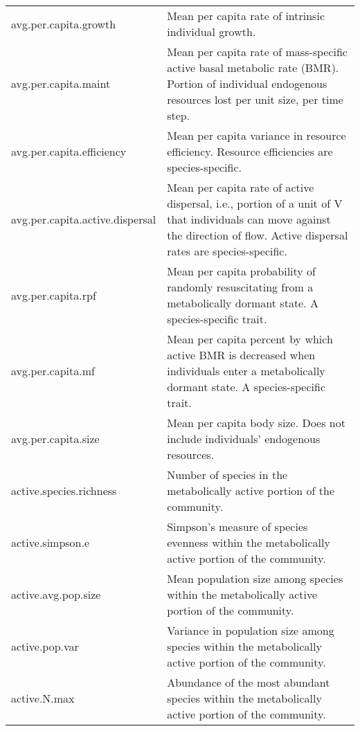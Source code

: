 \documentclass[12pt]{article}
\begin{document}
\begin{longtable}{| p{} | p{} |}
avg.per.capita.growth & Mean per capita rate of intrinsic individual growth. \\[6pt]

avg.per.capita.maint & Mean per capita rate of mass-specific active basal metabolic rate (BMR). Portion of individual endogenous resources lost per unit size, per time step. \\[6pt]

avg.per.capita.efficiency & Mean per capita variance in resource efficiency. Resource efficiencies are species-specific. \\[6pt]

avg.per.capita.active.dispersal & Mean per capita rate of active dispersal, i.e., portion of a unit of V that individuals can move against the direction of flow. Active dispersal rates are species-specific. \\[6pt]

avg.per.capita.rpf & Mean per capita probability of randomly resuscitating from a metabolically dormant state. A species-specific trait. \\[6pt]

avg.per.capita.mf & Mean per capita percent by which active BMR is decreased when individuals enter a metabolically dormant state. A species-specific trait. \\[6pt]

avg.per.capita.size & Mean per capita body size. Does not include individuals' endogenous resources. \\[6pt]

active.species.richness & Number of species in the metabolically active portion of the community. \\[6pt]

active.simpson.e & Simpson's measure of species evenness within the metabolically active portion of the community. \\[6pt]

active.avg.pop.size & Mean population size among species within the metabolically active portion of the community.  \\[6pt]

active.pop.var & Variance in population size among species within the metabolically active portion of the community. \\[6pt]

active.N.max & Abundance of the most abundant species within the metabolically active portion of the community. \\[6pt]


\end{longtable}
\end{document}
